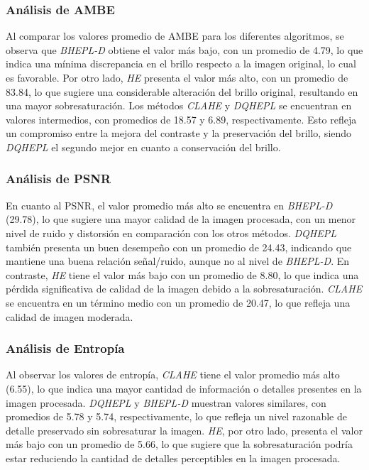 \documentclass[sigchi]{acmart}
\begin{document}
\subsubsection{Análisis de AMBE}
\label{subsubsec:analisis_ambe}

Al comparar los valores promedio de AMBE para los diferentes algoritmos, se observa que
\emph{BHEPL-D} obtiene el valor más bajo, con un promedio de 4.79, lo que indica una mínima
discrepancia en el brillo respecto a la imagen original, lo cual es favorable. Por otro lado,
\emph{HE} presenta el valor más alto, con un promedio de 83.84, lo que sugiere una
considerable alteración del brillo original, resultando en una mayor sobresaturación. Los
métodos \emph{CLAHE} y \emph{DQHEPL} se encuentran en valores intermedios, con promedios de
18.57 y 6.89, respectivamente. Esto refleja un compromiso entre la mejora del contraste y la
preservación del brillo, siendo \emph{DQHEPL} el segundo mejor en cuanto a conservación del
brillo.

\subsubsection{\textbf{Análisis de PSNR}}
\label{subsubsec:analisis_psnr}

En cuanto al PSNR, el valor promedio más alto se encuentra en \emph{BHEPL-D} (29.78), lo que
sugiere una mayor calidad de la imagen procesada, con un menor nivel de ruido y distorsión en
comparación con los otros métodos. \emph{DQHEPL} también presenta un buen desempeño con un
promedio de 24.43, indicando que mantiene una buena relación señal/ruido, aunque no al nivel de
\emph{BHEPL-D}. En contraste, \emph{HE} tiene el valor más bajo con un promedio de 8.80, lo
que indica una pérdida significativa de calidad de la imagen debido a la sobresaturación.
\emph{CLAHE} se encuentra en un término medio con un promedio de 20.47, lo que refleja una
calidad de imagen moderada.

\subsubsection{\textbf{Análisis de Entropía}}
\label{subsubsec:analisis_entropia}

Al observar los valores de entropía, \emph{CLAHE} tiene el valor promedio más alto (6.55), lo
que indica una mayor cantidad de información o detalles presentes en la imagen procesada.
\emph{DQHEPL} y \emph{BHEPL-D} muestran valores similares, con promedios de 5.78 y 5.74,
respectivamente, lo que refleja un nivel razonable de detalle preservado sin sobresaturar la
imagen. \emph{HE}, por otro lado, presenta el valor más bajo con un promedio de 5.66, lo que
sugiere que la sobresaturación podría estar reduciendo la cantidad de detalles perceptibles en
la imagen procesada.
\end{document}

